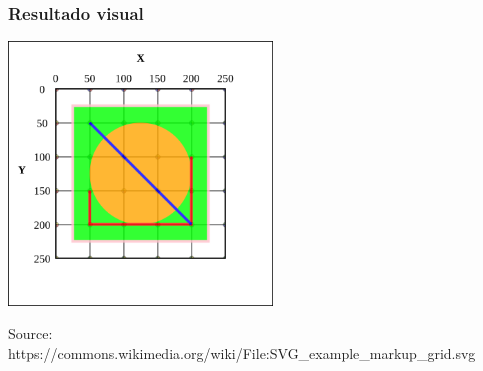 \begin{frame}
\frametitle{Resultado visual}

\begin{center}
  \includegraphics[width=7cm]{figs/svg-example.png}
\end{center}

\begin{flushright}
{\tiny
Source: https://commons.wikimedia.org/wiki/File:SVG\_example\_markup\_grid.svg
}
\end{flushright}

\end{frame}


